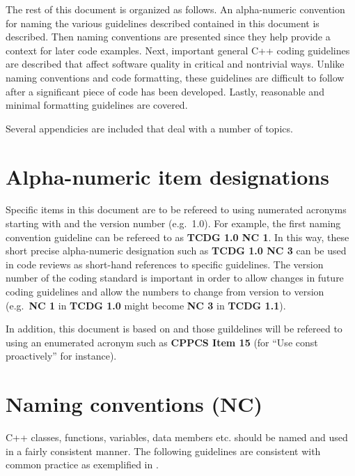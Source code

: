 The rest of this document is organized as follows.  An alpha-numeric
convention for naming the various guidelines described contained in this
document is described.  Then naming conventions are presented since they help
provide a context for later code examples.  Next, important general C++ coding
guidelines are described that affect software quality in critical and
nontrivial ways.  Unlike naming conventions and code formatting, these
guidelines are difficult to follow after a significant piece of code has been
developed.  Lastly, reasonable and minimal formatting guidelines are covered.

Several appendicies are included that deal with a number of topics.

%
\section{Alpha-numeric item designations}
%

Specific items in this document are to be refereed to using numerated acronyms
starting with {}\textbf{} and the version number (e.g.\ 1.0).  For
example, the first naming convention guideline can be refereed to as
{}\textbf{TCDG 1.0 NC 1}.  In this way, these short precise alpha-numeric
designation such as {}\textbf{TCDG 1.0 NC 3} can be used in code reviews as
short-hand references to specific guidelines.  The version number of the
coding standard is important in order to allow changes in future coding
guidelines and allow the numbers to change from version to version (e.g.\
{}\textbf{NC 1} in {}\textbf{TCDG 1.0} might become {}\textbf{NC 3} in
{}\textbf{TCDG 1.1}).

In addition, this document is based on {}\cite{C++CodingStandards05} and those
guildelines will be refereed to using an enumerated acronym such as
{}\textbf{CPPCS Item 15} (for ``Use const proactively'' for instance).

%
\section{Naming conventions (NC)}
%

C++ classes, functions, variables, data members etc. should be named and used
in a fairly consistent manner.  The following guidelines are consistent with
common practice as exemplified in {}\cite{EffectiveC++3rd05}.

